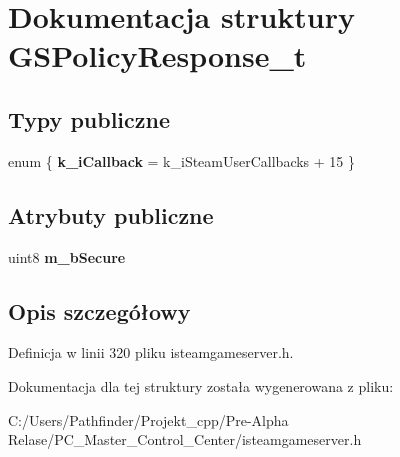 \hypertarget{struct_g_s_policy_response__t}{}\section{Dokumentacja struktury G\+S\+Policy\+Response\+\_\+t}
\label{struct_g_s_policy_response__t}
\subsection*{Typy publiczne}
\begin{DoxyCompactItemize}
\item 
\mbox{\label{struct_g_s_policy_response__t_a9ef4f568e366c4b25bc5c976c629782f}} 
enum \{ {\bfseries k\+\_\+i\+Callback} = k\+\_\+i\+Steam\+User\+Callbacks + 15
 \}
\end{DoxyCompactItemize}
\subsection*{Atrybuty publiczne}
\begin{DoxyCompactItemize}
\item 
\mbox{\label{struct_g_s_policy_response__t_abf8010b9749a18285a48f8f76ba3a323}} 
uint8 {\bfseries m\+\_\+b\+Secure}
\end{DoxyCompactItemize}


\subsection{Opis szczegółowy}


Definicja w linii 320 pliku isteamgameserver.\+h.



Dokumentacja dla tej struktury została wygenerowana z pliku\+:\begin{DoxyCompactItemize}
\item 
C\+:/\+Users/\+Pathfinder/\+Projekt\+\_\+cpp/\+Pre-\/\+Alpha Relase/\+P\+C\+\_\+\+Master\+\_\+\+Control\+\_\+\+Center/isteamgameserver.\+h\end{DoxyCompactItemize}
